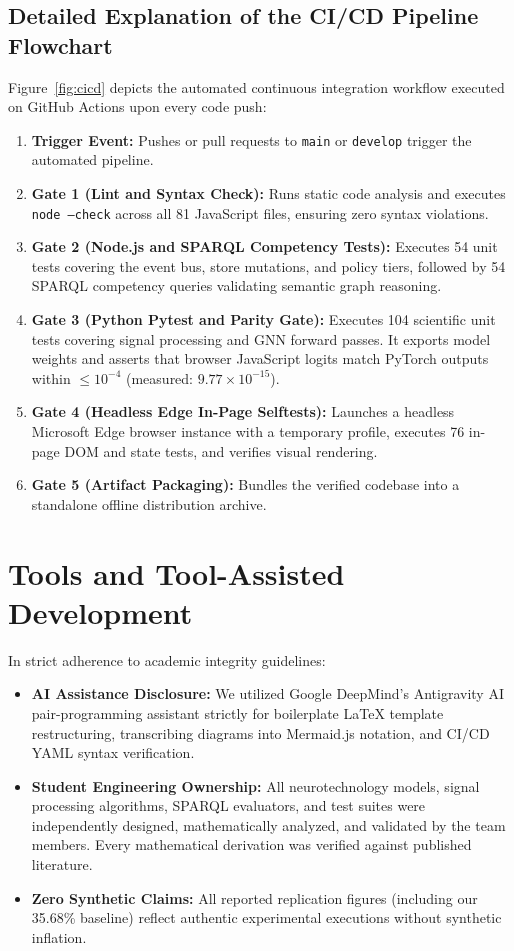 \documentclass[12pt,a4paper]{report}
\begin{document}
\subsection{Detailed Explanation of the CI/CD Pipeline Flowchart}
Figure~\ref{fig:cicd} depicts the automated continuous integration workflow executed on GitHub Actions upon every code push:
\begin{enumerate}[leftmargin=1.5em]
    \item \textbf{Trigger Event:} Pushes or pull requests to \texttt{main} or \texttt{develop} trigger the automated pipeline.
    \item \textbf{Gate 1 (Lint and Syntax Check):} Runs static code analysis and executes \texttt{node --check} across all 81 JavaScript files, ensuring zero syntax violations.
    \item \textbf{Gate 2 (Node.js and SPARQL Competency Tests):} Executes 54 unit tests covering the event bus, store mutations, and policy tiers, followed by 54 SPARQL competency queries validating semantic graph reasoning.
    \item \textbf{Gate 3 (Python Pytest and Parity Gate):} Executes 104 scientific unit tests covering signal processing and GNN forward passes. It exports model weights and asserts that browser JavaScript logits match PyTorch outputs within $\le 10^{-4}$ (measured: $9.77 \times 10^{-15}$).
    \item \textbf{Gate 4 (Headless Edge In-Page Selftests):} Launches a headless Microsoft Edge browser instance with a temporary profile, executes 76 in-page DOM and state tests, and verifies visual rendering.
    \item \textbf{Gate 5 (Artifact Packaging):} Bundles the verified codebase into a standalone offline distribution archive.
\end{enumerate}

\section{Tools and Tool-Assisted Development}
In strict adherence to academic integrity guidelines:
\begin{itemize}[leftmargin=1.5em]
    \item \textbf{AI Assistance Disclosure:} We utilized Google DeepMind's Antigravity AI pair-programming assistant strictly for boilerplate \LaTeX{} template restructuring, transcribing diagrams into Mermaid.js notation, and CI/CD YAML syntax verification.
    \item \textbf{Student Engineering Ownership:} All neurotechnology models, signal processing algorithms, SPARQL evaluators, and test suites were independently designed, mathematically analyzed, and validated by the team members. Every mathematical derivation was verified against published literature.
    \item \textbf{Zero Synthetic Claims:} All reported replication figures (including our 35.68\% baseline) reflect authentic experimental executions without synthetic inflation.
\end{itemize}
\end{document}
